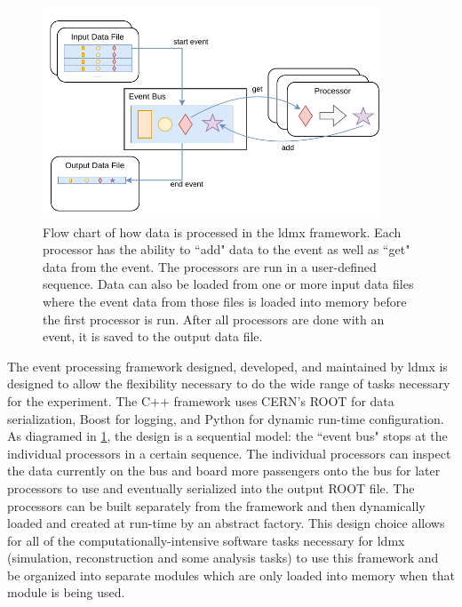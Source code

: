 \begin{figure}
	\centering
	\includegraphics[width=0.9\textwidth]{figures/ldmx/simulation/FrameworkFlowChart.drawio.pdf}
	\caption{Flow chart of how data is processed in the \ac{ldmx} framework. Each processor has the ability to ``add" data to the event as well as ``get" data from the event. The processors are run in a user-defined sequence. Data can also be loaded from one or more input data files where the event data from those files is loaded into memory before the first processor is run. After all processors are done with an event, it is saved to the output data file.}
	\label{fig:ldmx:sim:data-flow}
\end{figure}

The event processing framework designed, developed, and maintained by \ac{ldmx} is designed to allow the flexibility necessary to do the wide range of tasks necessary for the experiment. The C++ framework uses CERN's ROOT \cite{cernroot} for data serialization, Boost  for logging, and Python \cite{python} for dynamic run-time configuration. As diagramed in \cref{fig:ldmx:sim:data-flow}, the design is a sequential model: the ``event bus" stops at the individual processors in a certain sequence. The individual processors can inspect the data currently on the bus and board more passengers onto the bus for later processors to use and eventually serialized into the output ROOT file. The processors can be built separately from the framework and then dynamically loaded and created at run-time by an abstract factory. This design choice allows for all of the computationally-intensive software tasks necessary for \ac{ldmx} (simulation, reconstruction and some analysis tasks) to use this framework and be organized into separate modules which are only loaded into memory when that module is being used.


